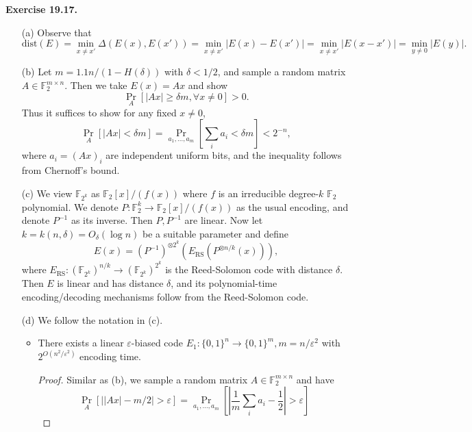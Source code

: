 \documentclass[a4paper]{article}
\newenvironment{exercise}[1]{
	\par
	\noindent\textbf{Exercise #1.}\quad
}{
	\par
	\bigskip
}
\newcommand{\abs}[1]{\left| #1 \right|}
\newcommand{\pbra}[1]{\left( #1 \right)}
\newcommand{\sbra}[1]{\left[ #1 \right]}
\newcommand{\bin}{\{0,1\}}
\newcommand{\Fbb}{\mathbb{F}}
\newcommand{\eps}{\varepsilon}
\begin{document}
    \begin{exercise}{19.17}
        \begin{itemize}
            \item[(a)] Observe that
                $$
                    \text{dist}(E)=\min_{x\neq x'}\Delta(E(x),E(x'))=\min_{x\neq x'}\abs{E(x)-E(x')}=\min_{x\neq x'}\abs{E(x-x')}
                    =\min_{y\neq0}\abs{E(y)}.
                $$
            \item[(b)] Let $m=1.1n/(1-H(\delta))$ with $\delta<1/2$, and sample a random matrix $A\in\Fbb_2^{m\times n}$.
                Then we take $E(x)=Ax$ and show 
                $$
                \Pr_A\sbra{\abs{Ax}\geq\delta m,\forall x\neq0}>0.
                $$
                Thus it suffices to show for any fixed $x\neq0$, 
                $$
                \Pr_A\sbra{\abs{Ax}<\delta m}=\Pr_{a_1,\ldots,a_m}\sbra{\sum_ia_i<\delta m}<2^{-n},
                $$
                where $a_i=(Ax)_i$ are independent uniform bits, and the inequality follows from Chernoff's bound.
            \item[(c)] We view $\Fbb_{2^k}$ as $\Fbb_2[x]/(f(x))$ where $f$ is an irreducible degree-$k$ $\Fbb_2$ polynomial.
                We denote $P:\Fbb_2^k\to\Fbb_2[x]/(f(x))$ as the usual encoding, and denote $P^{-1}$ as its inverse.
                Then $P,P^{-1}$ are linear. Now let $k=k(n,\delta)=O_\delta(\log n)$ be a suitable parameter and define 
                $$
                E(x)=(P^{-1})^{\otimes 2^k}(E_\text{RS}(P^{\otimes n/k}(x))),
                $$
                where $E_\text{RS}:(\Fbb_{2^k})^{n/k}\to(\Fbb_{2^k})^{2^k}$ is the Reed-Solomon code with distance $\delta$. 
                Then $E$ is linear and has distance $\delta$, and its polynomial-time
                encoding/decoding mechanisms follow from the Reed-Solomon code.
            \item[(d)]
                We follow the notation in (c). 
                \begin{itemize}
                    \item There exists a linear $\eps$-biased code $E_1:\bin^n\to\bin^m,m=n/\eps^2$ with 
                        $2^{O\pbra{n^2/\eps^2}}$ encoding time.
                        \begin{proof}
                        Similar as (b), we sample a random matrix $A\in\Fbb_2^{m\times n}$ and have 
                        $$
                        \Pr_A\sbra{\abs{\abs{Ax}-m/2}>\eps}
                        =\Pr_{a_1,\ldots,a_m}\sbra{\abs{\frac1m\sum_ia_i-\frac12}>\eps}
$$
\end{proof}
\end{itemize}
\end{itemize}
\end{exercise}
\end{document}
